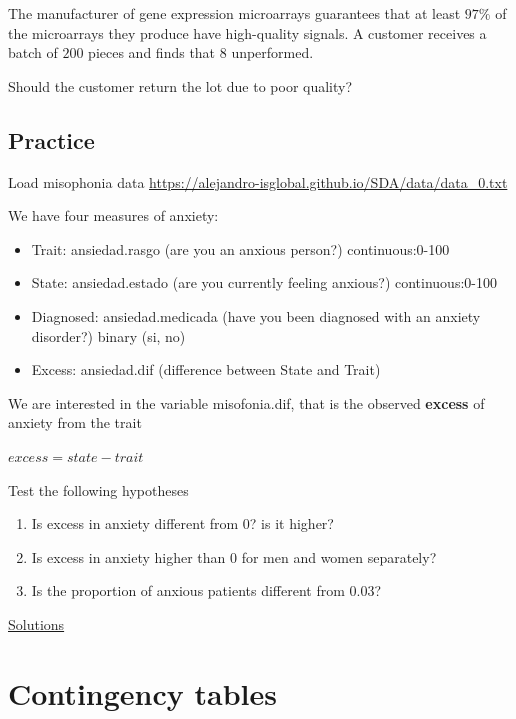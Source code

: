 \documentclass[
]{book}
\providecommand{\tightlist}{%
  \setlength{\itemsep}{0pt}\setlength{\parskip}{0pt}}
\begin{document}
The manufacturer of gene expression microarrays guarantees that at least \(97\%\) of the microarrays they produce have high-quality signals. A customer receives a batch of \(200\) pieces and finds that \(8\) unperformed.

Should the customer return the lot due to poor quality?

\hypertarget{practice-4}{%
\section{Practice}\label{practice-4}}

Load misophonia data \url{https://alejandro-isglobal.github.io/SDA/data/data_0.txt}

We have four measures of anxiety:

\begin{itemize}
\tightlist
\item
  Trait: ansiedad.rasgo (are you an anxious person?) continuous:0-100
\item
  State: ansiedad.estado (are you currently feeling anxious?) continuous:0-100
\item
  Diagnosed: ansiedad.medicada (have you been diagnosed with an anxiety disorder?) binary (si, no)
\item
  Excess: ansiedad.dif (difference between State and Trait)
\end{itemize}

We are interested in the variable misofonia.dif, that is the observed \textbf{excess} of anxiety from the trait

\(excess = state - trait\)

Test the following hypotheses

\begin{enumerate}
\def\labelenumi{\alph{enumi}.}
\item
  Is excess in anxiety different from 0? is it higher?
\item
  Is excess in anxiety higher than 0 for men and women separately?
\item
  Is the proportion of anxious patients different from \(0.03\)?
\end{enumerate}

\href{https://colab.research.google.com/drive/13El5aoycT_6Wasvyx427TvglygiSPMpF?usp=sharing}{Solutions}

\hypertarget{contingency-tables}{%
\chapter{Contingency tables}\label{contingency-tables}}
\end{document}
